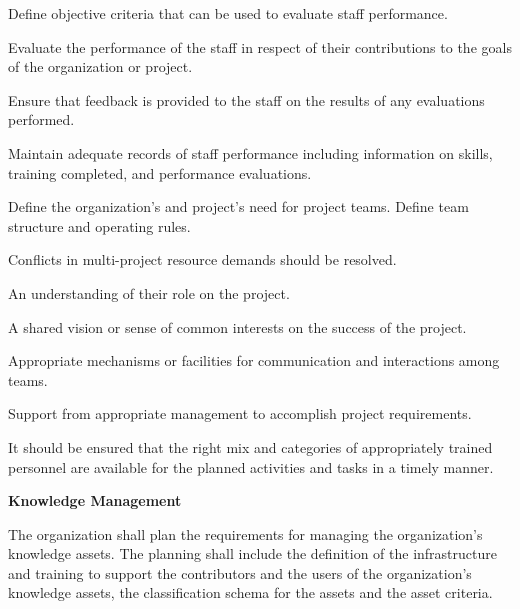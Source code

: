 \begin{adjustwidth}{2em}{0pt}
\begin{compactenum}
\begin{compactenum}
						\item Define objective criteria that can be used to evaluate staff performance.

						\item Evaluate the performance of the staff in respect of their contributions to the goals of the organization or project.

						\item Ensure that feedback is provided to the staff on the results of any evaluations performed.

						\item Maintain adequate records of staff performance including information on skills, training completed, and performance evaluations. 

						\item Define the organization's and project's need for project teams. Define team structure and operating rules.

						\item Conflicts in multi-project resource demands should be resolved.

						\item An understanding of their role on the project.

						\item A shared vision or sense of common interests on the success of the project.

						\item Appropriate mechanisms or facilities for communication and interactions among teams.

						\item Support from appropriate management to accomplish project requirements.

						\item It should be ensured that the right mix and categories of appropriately trained personnel are available for the planned activities and tasks in a timely manner.

					\end{compactenum}

					\item {\bf Knowledge Management}

					\begin{compactenum}	

						\item The organization shall plan the requirements for managing the organization's knowledge assets. The planning shall  include the definition of the infrastructure and training to support the contributors and the users of the organization's knowledge assets, the classification schema for the assets and the asset criteria.
						

\end{compactenum}
\end{compactenum}
\end{adjustwidth}
